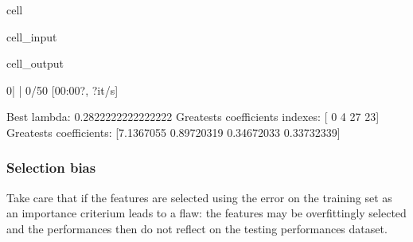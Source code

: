 \documentclass[letterpaper,10pt,english]{jupyterBook}
\begin{document}
\begin{sphinxuseclass}{cell}
\begin{sphinxVerbatimInput}
\begin{sphinxuseclass}{cell_input}
\end{sphinxuseclass}\end{sphinxVerbatimInput}
\begin{sphinxVerbatimOutput}

\begin{sphinxuseclass}{cell_output}
\begin{sphinxVerbatim}[commandchars=\\\{\}]
  0\PYGZpc{}|          | 0/50 [00:00\PYGZlt{}?, ?it/s]
\end{sphinxVerbatim}

\begin{sphinxVerbatim}[commandchars=\\\{\}]
Best lambda: 0.2822222222222222
Greatests coefficients indexes: [ 0  4 27 23]
Greatests coefficients: [\PYGZhy{}7.1367055   0.89720319 \PYGZhy{}0.34672033 \PYGZhy{}0.33732339]
\end{sphinxVerbatim}

\noindent{}

\end{sphinxuseclass}\end{sphinxVerbatimOutput}

\end{sphinxuseclass}

\subsubsection{Selection bias}
\label{\detokenize{05:selection-bias}}
\sphinxAtStartPar
Take care that if the features are selected using the error on the training set as an importance criterium leads to a flaw: the features may be over\sphinxhyphen{}fittingly selected and the performances then do not reflect on the testing performances dataset.
\end{document}

